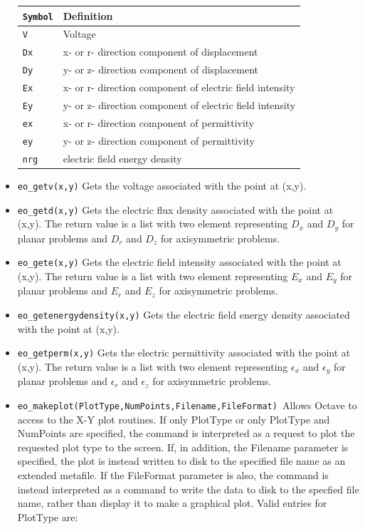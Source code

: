 \begin{itemize}
\begin{tabular}{ll}
\texttt{Symbol} &  Definition \\ \hline
\texttt{V} & Voltage \\
\texttt{Dx} & x- or r- direction component of displacement \\
\texttt{Dy} & y- or z- direction component of displacement \\
\texttt{Ex} & x- or r- direction component of electric field intensity \\
\texttt{Ey} & y- or z- direction component of electric field intensity \\
\texttt{ex} & x- or r- direction component of permittivity \\
\texttt{ey} & y- or z- direction component of permittivity \\
\texttt{nrg} & electric field energy density \\
\end{tabular}

\item{\tt eo\_getv(x,y)} Gets the voltage associated with the point at (x,y).

\item{\tt eo\_getd(x,y)} Gets the electric flux density associated with the point at (x,y).
The return value is a list with two element representing $D_x$ and
$D_y$ for planar problems and $D_r$ and $D_z$ for axisymmetric problems.

\item{\tt eo\_gete(x,y)} Gets the electric field intensity associated with the point at (x,y).
The return value is a list with two element representing $E_x$ and
$E_y$ for planar problems and $E_r$ and $E_z$ for axisymmetric problems.

\item{\tt eo\_getenergydensity(x,y)} Gets the electric field energy density associated with the point at (x,y).

\item{\tt eo\_getperm(x,y)} Gets the electric permittivity associated with the point at (x,y).
The return value is a list with two element representing $\epsilon_x$ and
$\epsilon_y$ for planar problems and $\epsilon_r$ and $\epsilon_z$ for axisymmetric problems.

\item \texttt{eo\_makeplot(PlotType,NumPoints,Filename,FileFormat) }Allows Octave to access
to the X-Y plot routines. If only PlotType or only PlotType and NumPoints
are specified, the command is interpreted as a request to plot the requested
plot type to the screen. If, in addition, the Filename parameter is
specified, the plot is instead written to disk to the specified file name as
an extended metafile. If the FileFormat parameter is also, the command is
instead interpreted as a command to write the data to disk to the specfied
file name, rather than display it to make a graphical plot. Valid entries
for PlotType are:


\end{itemize}
